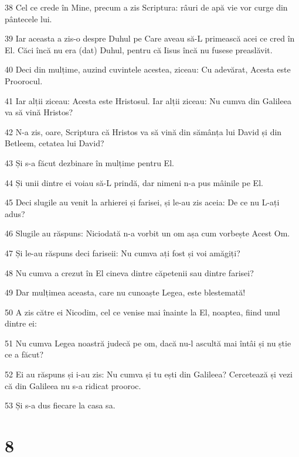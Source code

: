 \par 38 Cel ce crede în Mine, precum a zis Scriptura: râuri de apă vie vor curge din pântecele lui.
\par 39 Iar aceasta a zis-o despre Duhul pe Care aveau să-L primească acei ce cred în El. Căci încă nu era (dat) Duhul, pentru că Iisus încă nu fusese preaslăvit.
\par 40 Deci din mulțime, auzind cuvintele acestea, ziceau: Cu adevărat, Acesta este Proorocul.
\par 41 Iar alții ziceau: Acesta este Hristosul. Iar alții ziceau: Nu cumva din Galileea va să vină Hristos?
\par 42 N-a zis, oare, Scriptura că Hristos va să vină din sămânța lui David și din Betleem, cetatea lui David?
\par 43 Și s-a făcut dezbinare în mulțime pentru El.
\par 44 Și unii dintre ei voiau să-L prindă, dar nimeni n-a pus mâinile pe El.
\par 45 Deci slugile au venit la arhierei și farisei, și le-au zis aceia: De ce nu L-ați adus?
\par 46 Slugile au răspuns: Niciodată n-a vorbit un om așa cum vorbește Acest Om.
\par 47 Și le-au răspuns deci fariseii: Nu cumva ați fost și voi amăgiți?
\par 48 Nu cumva a crezut în El cineva dintre căpetenii sau dintre farisei?
\par 49 Dar mulțimea aceasta, care nu cunoaște Legea, este blestemată!
\par 50 A zis către ei Nicodim, cel ce venise mai înainte la El, noaptea, fiind unul dintre ei:
\par 51 Nu cumva Legea noastră judecă pe om, dacă nu-l ascultă mai întâi și nu știe ce a făcut?
\par 52 Ei au răspuns și i-au zis: Nu cumva și tu ești din Galileea? Cercetează și vezi că din Galileea nu s-a ridicat prooroc.
\par 53 Și s-a dus fiecare la casa sa.

\chapter{8}

